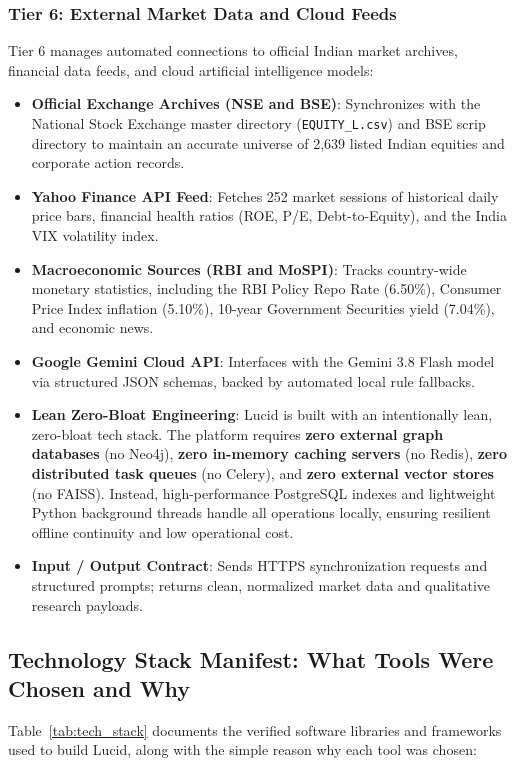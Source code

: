 \subsubsection{Tier 6: External Market Data and Cloud Feeds}
Tier 6 manages automated connections to official Indian market archives, financial data feeds, and cloud artificial intelligence models:
\begin{itemize}
    \item \textbf{Official Exchange Archives (NSE and BSE)}: Synchronizes with the National Stock Exchange master directory (\texttt{EQUITY\_L.csv}) and BSE scrip directory to maintain an accurate universe of 2,639 listed Indian equities and corporate action records.
    \item \textbf{Yahoo Finance API Feed}: Fetches 252 market sessions of historical daily price bars, financial health ratios (ROE, P/E, Debt-to-Equity), and the India VIX volatility index.
    \item \textbf{Macroeconomic Sources (RBI and MoSPI)}: Tracks country-wide monetary statistics, including the RBI Policy Repo Rate (6.50\%), Consumer Price Index inflation (5.10\%), 10-year Government Securities yield (7.04\%), and economic news.
    \item \textbf{Google Gemini Cloud API}: Interfaces with the Gemini 3.8 Flash model via structured JSON schemas, backed by automated local rule fallbacks.
    \item \textbf{Lean Zero-Bloat Engineering}: Lucid is built with an intentionally lean, zero-bloat tech stack. The platform requires \textbf{zero external graph databases} (no Neo4j), \textbf{zero in-memory caching servers} (no Redis), \textbf{zero distributed task queues} (no Celery), and \textbf{zero external vector stores} (no FAISS). Instead, high-performance PostgreSQL indexes and lightweight Python background threads handle all operations locally, ensuring resilient offline continuity and low operational cost.
    \item \textbf{Input / Output Contract}: Sends HTTPS synchronization requests and structured prompts; returns clean, normalized market data and qualitative research payloads.
\end{itemize}

\subsection{Technology Stack Manifest: What Tools Were Chosen and Why}
Table~\ref{tab:tech_stack} documents the verified software libraries and frameworks used to build Lucid, along with the simple reason why each tool was chosen:


